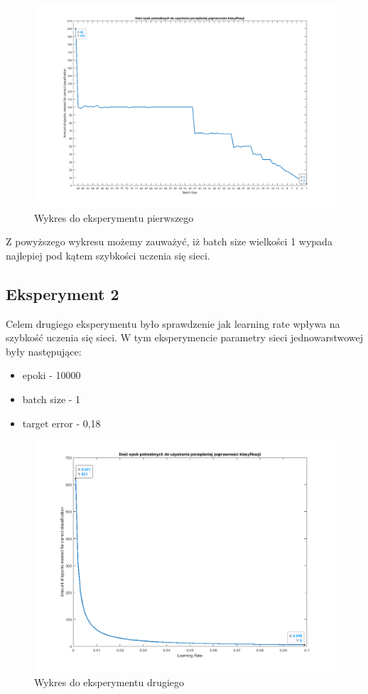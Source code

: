 \documentclass[12pt,twoside]{article}
\begin{document}
\begin{figure}[ht!]
	\centering
	\includegraphics[width=15cm]{figures/batch_epo.png}
	\caption{Wykres do eksperymentu pierwszego}
\end{figure}
Z powyższego wykresu możemy zauważyć, iż batch size wielkości 1 wypada najlepiej pod kątem szybkości uczenia się sieci.
\newpage



\subsection{Eksperyment 2}
Celem drugiego eksperymentu było sprawdzenie jak learning rate wpływa na szybkość uczenia się sieci.
W tym eksperymencie parametry sieci jednowarstwowej były następujące:
\begin{itemize}
	\item epoki - 10000
	\item batch size - 1
	\item target error - 0,18
\end{itemize}

\begin{figure}[ht!]
	\centering
	\includegraphics[width=15cm]{figures/eta_epo.png}
	\caption{Wykres do eksperymentu drugiego}
\end{figure}
\newpage
\end{document}

